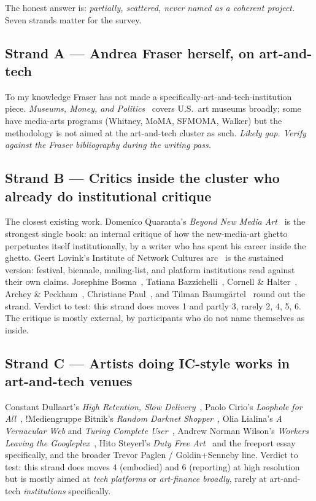 \documentclass[10pt,letterpaper,twocolumn]{article}
\begin{document}
The honest answer is: \emph{partially, scattered, never named as a coherent project.} Seven strands matter for the survey.

\subsection{Strand A --- Andrea Fraser herself, on art-and-tech}

To my knowledge Fraser has not made a specifically-art-and-tech-institution piece. \emph{Museums, Money, and Politics}~\citep{fraser2018museums} covers U.S.\ art museums broadly; some have media-arts programs (Whitney, MoMA, SFMOMA, Walker) but the methodology is not aimed at the art-and-tech cluster as such. \emph{Likely gap. Verify against the Fraser bibliography during the writing pass.}

\subsection{Strand B --- Critics inside the cluster who already do institutional critique}

The closest existing work. Domenico Quaranta's \emph{Beyond New Media Art}~\citep{quaranta2013beyond} is the strongest single book: an internal critique of how the new-media-art ghetto perpetuates itself institutionally, by a writer who has spent his career inside the ghetto. Geert Lovink's Institute of Network Cultures arc~\citep{lovink2011networks,lovink2016social,lovink2019sad} is the sustained version: festival, biennale, mailing-list, and platform institutions read against their own claims. Josephine Bosma~\citep{bosma2011nettitudes}, Tatiana Bazzichelli~\citep{bazzichelli2013networked}, Cornell \& Halter~\citep{cornell2015mass}, Archey \& Peckham~\citep{archey2014postinternet}, Christiane Paul~\citep{paul2015digital}, and Tilman Baumg\"artel~\citep{baumgaertel2001netart} round out the strand. Verdict to test: this strand does moves 1 and partly 3, rarely 2, 4, 5, 6. The critique is mostly external, by participants who do not name themselves as inside.

\subsection{Strand C --- Artists doing IC-style works in art-and-tech venues}

Constant Dullaart's \emph{High Retention, Slow Delivery}~\citep{dullaart2014retention}, Paolo Cirio's \emph{Loophole for All}~\citep{cirio2013loophole}, !Mediengruppe Bitnik's \emph{Random Darknet Shopper}~\citep{bitnik2014darknet}, Olia Lialina's \emph{A Vernacular Web} and \emph{Turing Complete User}~\citep{lialina2005vernacular,lialina2012turing}, Andrew Norman Wilson's \emph{Workers Leaving the Googleplex}~\citep{wilson2011googleplex}, Hito Steyerl's \emph{Duty Free Art}~\citep{steyerl2017duty} and the freeport essay specifically, and the broader Trevor Paglen / Goldin+Senneby line. Verdict to test: this strand does moves 4 (embodied) and 6 (reporting) at high resolution but is mostly aimed at \emph{tech platforms} or \emph{art-finance broadly}, rarely at art-and-tech \emph{institutions} specifically.
\end{document}
